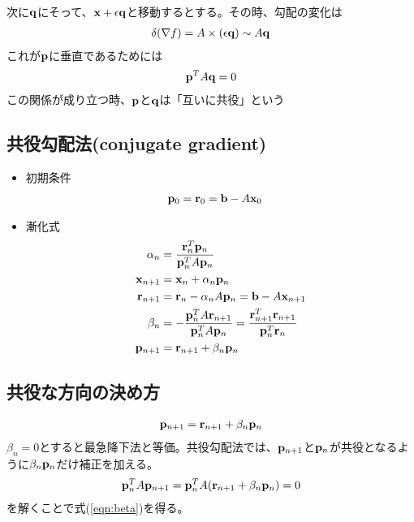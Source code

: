 \documentclass[11pt]{jarticle}
\begin{document}
次に${\bf q}$にそって、${\bf x}+\epsilon {\bf q}$と移動するとする。その時、勾配の変化は
\begin{align}
\delta(\nabla f) = A \times (\epsilon {\bf q}) \sim A {\bf q}
\end{align}
これが${\bf p}$に垂直であるためには
\begin{align}
  {\bf p}^T A {\bf q} = 0
\end{align}
この関係が成り立つ時、${\bf p}$と${\bf q}$は「互いに共役」という

\subsection{共役勾配法(conjugate gradient)}

\begin{itemize}
\item 初期条件
  \begin{align}
    {\bf p}_0 &= {\bf r}_0 = {\bf b} - A {\bf x}_0
  \end{align}
\item 漸化式
\begin{align}
  \alpha_n &= \frac{{\bf r}_n^T {\bf p}_n}{{\bf p}_n^T A {\bf p}_n} \\
  {\bf x}_{n+1} &= {\bf x}_n + \alpha_n {\bf p}_n \\
  {\bf r}_{n+1} &= {\bf r}_n - \alpha_n A {\bf p}_n = {\bf b} - A {\bf x}_{n+1} \\
  \beta_n &= - \frac{{\bf p}_{n}^T A {\bf r}_{n+1}}{{\bf p}_n^T A {\bf p}_n} = \frac{{\bf r}_{n+1}^T {\bf r}_{n+1}}{{\bf p}_{n}^T{\bf r}_{n}}
  \label{eqn:beta} \\
  {\bf p}_{n+1} &= {\bf r}_{n+1} + \beta_n {\bf p}_n
\end{align}
\end{itemize}

\subsection{共役な方向の決め方}

\begin{align}
  {\bf p}_{n+1} = {\bf r}_{n+1} + \beta_n {\bf p}_n
\end{align}
$\beta_n=0$とすると最急降下法と等価。共役勾配法では、${\bf p}_{n+1}$と${\bf p}_{n}$が共役となるように$\beta_n {\bf p}_n$だけ補正を加える。
\begin{align}
  {\bf p}_n^T A {\bf p}_{n+1} = {\bf p}_n^T A ({\bf r}_{n+1} + \beta_n {\bf p}_n) = 0
\end{align}
を解くことで式(\ref{eqn:beta})を得る。
\end{document}
